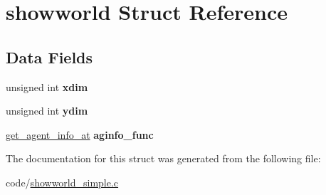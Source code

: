 \hypertarget{structshowworld}{}\section{showworld Struct Reference}
\label{structshowworld}
\subsection*{Data Fields}
\begin{DoxyCompactItemize}
\item 
\mbox{\label{structshowworld_a13ccb48c2d0f4bf22feb3b79d1a59cd1}} 
unsigned int {\bfseries xdim}
\item 
\mbox{\label{structshowworld_acd5145dde85bed8b6ecaffcaa286d16b}} 
unsigned int {\bfseries ydim}
\item 
\mbox{\label{structshowworld_ace712a32ac03fe3ba418465fbad4f536}} 
\mbox{\hyperlink{showworld_8h_aa7881dde0e99af6e6576a7401f3c4586}{get\+\_\+agent\+\_\+info\+\_\+at}} {\bfseries aginfo\+\_\+func}
\end{DoxyCompactItemize}


The documentation for this struct was generated from the following file\+:\begin{DoxyCompactItemize}
\item 
code/\mbox{\hyperlink{showworld__simple_8c}{showworld\+\_\+simple.\+c}}\end{DoxyCompactItemize}
